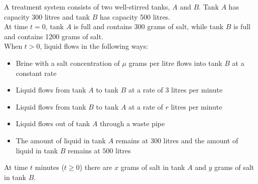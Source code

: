 \documentclass[leqno]{article}
\begin{document}
\begin{enumerate}[
  label=\textbf{\arabic*.},
  leftmargin=*,
  topsep=0pt,
  partopsep=0pt,
  parsep=0pt
]
\begin{figure}[H]
\end{figure}

\vspace*{10pt}

A treatment system consists of two well-stirred tanks, $A$ and $B$. Tank $A$ has capacity 300 litres and tank $B$ has capacity 500 litres. \\

At time $t=0$, tank $A$ is full and contains 300 grams of salt, while tank $B$ is full and contains 1200 grams of salt. \\

When $t>0$, liquid flows in the following ways: \\
\begin{itemize}
  \item Brine with a salt concentration of $\mu$ grams per litre flows into tank $B$ at a constant rate
  \item Liquid flows from tank $A$ to tank $B$ at a rate of $3$ litres per minute
  \item Liquid flows from tank $B$ to tank $A$ at a rate of $r$ litres per minute
  \item Liquid flows out of tank $A$ through a waste pipe
  \item The amount of liquid in tank $A$ remains at $300$ litres and the amount of liquid in tank $B$ remains at $500$ litres \\
\end{itemize}
At time $t$ minutes ($t\ge 0$) there are $x$ grams of salt in tank $A$ and $y$ grams of salt in tank $B$. \\


\end{enumerate}
\end{document}
